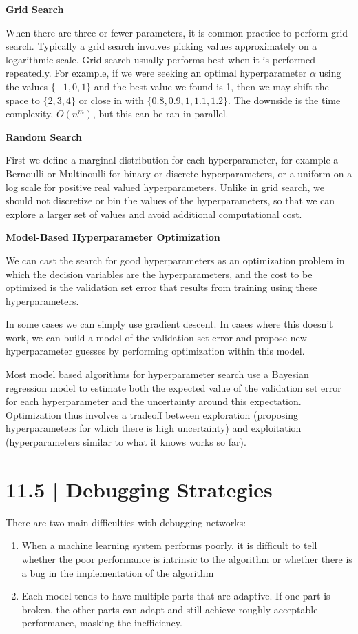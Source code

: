 \documentclass[letterpaper, 12pt]{report}
\begin{document}
\textbf{Grid Search}

When there are three or fewer parameters, it is common practice to perform grid search. Typically a grid search involves picking values approximately on a logarithmic scale. Grid search usually performs best when it is performed repeatedly. For example, if we were seeking an optimal hyperparameter $\alpha$ using the values $\{-1, 0, 1\}$ and the best value we found is 1, then we may shift the space to $\{2, 3, 4\}$ or close in with $\{0.8, 0.9, 1,  1.1, 1.2\}$. The downside is the time complexity, $O(n^m)$, but this can be ran in parallel. 

\textbf{Random Search}

First we define a marginal distribution for each hyperparameter, for example a Bernoulli or Multinoulli for binary or discrete hyperparameters, or a uniform on a log scale for positive real valued hyperparameters. Unlike in grid search, we should not discretize or bin the values of the hyperparameters, so that we can explore a larger set of values and avoid additional computational cost. 

\textbf{Model-Based Hyperparameter Optimization}

We can cast the search for good hyperparameters as an optimization problem in which the decision variables are the hyperparameters, and the cost to be optimized is the validation set error that results from training using these hyperparameters. 

In some cases we can simply use gradient descent. In cases where this doesn't work, we can build a model of the validation set error and propose new hyperparameter guesses by performing optimization within this model. 

Most model based algorithms for hyperparameter search use a Bayesian regression model to estimate both the expected value of the validation set error for each hyperparameter and the uncertainty around this expectation. Optimization thus involves a tradeoff between exploration (proposing hyperparameters for which there is high uncertainty) and exploitation (hyperparameters similar to what it knows works so far). 

\section{11.5 | Debugging Strategies}

There are two main difficulties with debugging networks:

\begin{enumerate}
\item When a machine learning system performs poorly, it is difficult to tell whether the poor performance is intrinsic to the algorithm or whether there is a bug in the implementation of the algorithm 
\item Each model tends to have multiple parts that are adaptive. If one part is broken, the other parts can adapt and still achieve roughly acceptable performance, masking the inefficiency. 
\end{enumerate}
\end{document}

